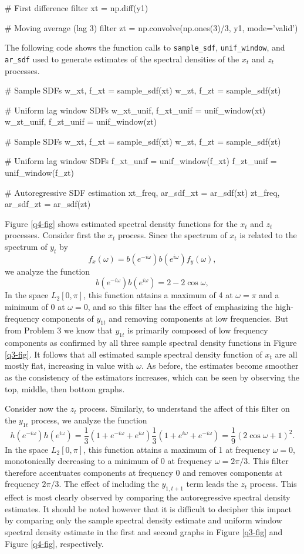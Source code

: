 \documentclass[oneside, a4paper]{amsart}
\begin{document}
\begin{python3code}
# First difference filter 
xt = np.diff(y1)

# Moving average (lag 3) filter
zt = np.convolve(np.ones(3)/3, y1, mode='valid')
\end{python3code}
The following code shows the function calls to \texttt{sample_sdf},  \texttt{unif_window}, and \texttt{ar_sdf} used to generate estimates of the spectral densities of the $x_t$ and $z_t$ processes. 
\begin{python3code}
# Sample SDFs
w_xt, f_xt = sample_sdf(xt)
w_zt, f_zt = sample_sdf(zt)

# Uniform lag window SDFs
w_xt_unif, f_xt_unif = unif_window(xt)
w_zt_unif, f_zt_unif = unif_window(zt)

# Sample SDFs
w_xt, f_xt = sample_sdf(xt)
w_zt, f_zt = sample_sdf(zt)

# Uniform lag window SDFs
f_xt_unif = unif_window(f_xt)
f_zt_unif = unif_window(f_zt)

# Autoregressive SDF estimation 
xt_freq, ar_sdf_xt = ar_sdf(xt)
zt_freq, ar_sdf_zt = ar_sdf(zt)
\end{python3code}
Figure \ref{q4-fig} shows estimated spectral density functions for the $x_t$ and $z_t$ processes. Consider first the $x_t$ process. Since the spectrum of $x_t$ is related to the spectrum of $y_t$ by 
\[
	f_x(\omega) = b(e^{-i\omega})b(e^{i\omega}) f_y(\omega), 
\]
we analyze the function
\[
	b(e^{-i\omega})b(e^{i\omega}) = 2 - 2 \cos \omega,
\]
In the space $L_2[0,\pi]$, this function attains a maximum of 4 at $\omega=\pi$ and a minimum of 0 at $\omega=0$, and so this filter has the effect of emphasizing the high-frequency components of $y_{1t}$ and removing components at low frequencies. But from Problem 3 we know that $y_{1t}$ is primarily composed of low frequency components as confirmed by all three sample spectral density functions in Figure \ref{q3-fig}. It follows that all estimated sample spectral density function of $x_t$ are all mostly flat, increasing in value with $\omega$. As before, the estimates become smoother as the consistency of the estimators increases, which can be seen by observing the top, middle, then bottom graphs. 
\par
Consider now the $z_t$ process. Similarly, to understand the affect of this filter on the $y_{1t}$ process, we analyze the function
\[
	h(e^{-i\omega}) h(e^{i\omega}) = \frac{1}{3} (1+ e^{-i\omega} + e^{i\omega})\frac{1}{3} (1+ e^{i\omega} + e^{-i\omega}) = \frac{1}{9} (2 \cos \omega + 1)^2.
\]
In the space $L_2[0,\pi]$, this function attains a maximum of 1 at frequency $\omega=0$, monotonically decreasing to a minimum of 0 at frequency $\omega = 2 \pi/3$. This filter therefore accentuates components at frequency 0 and removes components at frequency $2 \pi/3$. The effect of including the $y_{1,t+1}$ term leads the $z_t$ process. This effect is most clearly observed by comparing the autoregressive spectral density estimates. It should be noted however that it is difficult to decipher this impact by comparing only the sample spectral density estimate and uniform window spectral density estimate in the first and second graphs in Figure \ref{q3-fig} and Figure \ref{q4-fig}, respectively. 
\end{document}
